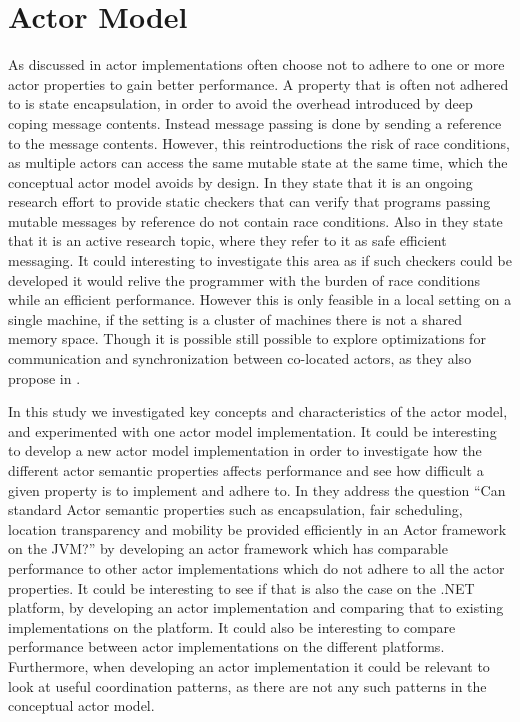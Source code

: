 \section{Actor Model}
\label{sec:future_actor}
As discussed in  actor implementations often choose not to adhere to one or more actor properties to gain better performance. A property that is often not adhered to is state encapsulation, in order to avoid the overhead introduced by deep coping message contents. Instead message passing is done by sending a reference to the message contents. However, this reintroductions the risk of race conditions, as multiple actors can access the same mutable state at the same time, which the conceptual actor model avoids by design. In \cite[p. 15]{haller2012actors} they state that it is an ongoing research effort to provide static checkers that can verify that programs passing mutable messages by reference do not contain race conditions. Also in \cite[p. 9]{karmani2009actor} they state that it is an active research topic, where they refer to it as safe efficient messaging. It could interesting to investigate this area as if such checkers could be developed it would relive the programmer with the burden of race conditions while an efficient performance. However this is only feasible in a local setting on a single machine, if the setting is a cluster of machines there is not a shared memory space. Though it is possible still possible to explore optimizations for communication and synchronization between co-located actors, as they also propose in \cite[p. 9]{karmani2009actor}.

In this study we investigated key concepts and characteristics of the actor model, and experimented with one actor model implementation. It could be interesting to develop a new actor model implementation in order to investigate how the different actor semantic properties affects performance and see how difficult a given property is to implement and adhere to. In \cite{karmani2009actor} they address the question ``Can standard Actor semantic properties such as encapsulation, fair scheduling, location transparency and mobility be provided efficiently in an Actor framework on the JVM?'' by developing an actor framework which has comparable performance to other actor implementations which do not adhere to all the actor properties. It could be interesting to see if that is also the case on the .NET platform, by developing an actor implementation and comparing that to existing implementations on the platform. It could also be interesting to compare performance between actor implementations on the different platforms. Furthermore, when developing an actor implementation it could be relevant to look at useful coordination patterns, as there are not any such patterns in the conceptual actor model.

